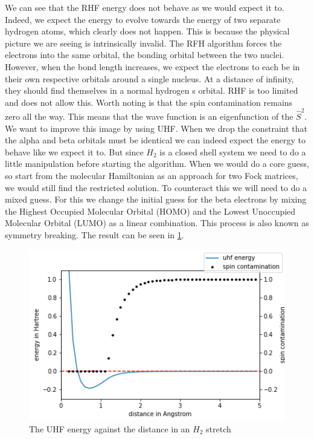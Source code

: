 \documentclass[twoside,twocolumn,9pt]{article}
\begin{document}
We can see that the RHF energy does not behave as we would expect it to. Indeed, we expect the energy to evolve towards the energy of two separate hydrogen atoms, which clearly does
not happen. This is because the physical picture we are seeing is intrinsically invalid. The RFH algorithm forces the electrons into the same orbital, the bonding orbital between
the two nuclei. However, when the bond length increases, we expect the electrons to each be in their own respective orbitals around a single nucleus. At a distance of infinity, they
should find themselves in a normal hydrogen s orbital. RHF is too limited and does not allow this. Worth noting is that the spin contamination remains zero all the way. This means
that the wave function is an eigenfunction of the $\hat{S}^2$\cite{Scuseria2011}. \\
We want to improve this image by using UHF.  When we drop the constraint that the alpha and beta orbitals must be identical we can indeed expect the energy to behave like we expect
it to. But since $H_2$ is a closed shell system we need to do a little manipulation before starting the algorithm. When we would do a core guess, so start from the molecular
Hamiltonian as an approach for two Fock matrices, we would still find the restricted solution. To counteract this we will need to do a mixed guess. For this we change the initial
guess for the beta electrons by mixing the Highest Occupied Molecular Orbital (HOMO) and the Lowest Unoccupied Molecular Orbital (LUMO) as a linear combination. This process is also
known as symmetry breaking. The result can be seen in \ref{fig:uhfstretch}.

\begin{center}
  \begin{figure}[h]
    \includegraphics[width=\linewidth]{./../notes/figures/uhf.png}
    \caption{The UHF energy against the distance in an $H_2$ stretch}
    \label{fig:uhfstretch}
  \end{figure}
\end{center}
\end{document}
